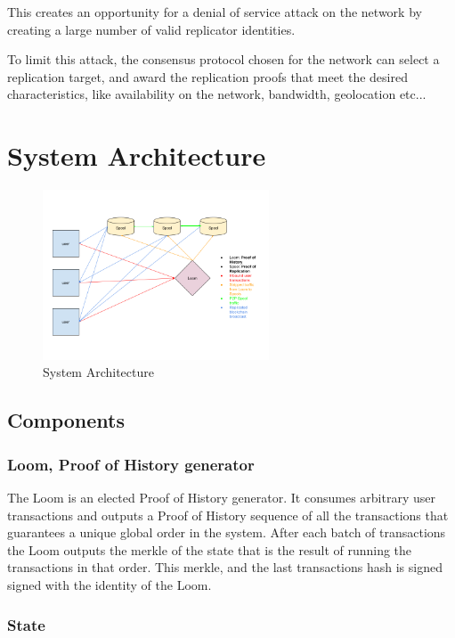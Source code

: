 \documentclass[12pt]{article}
\begin{document}
This creates an opportunity for a denial of service attack on the network by creating a large number of valid replicator identities.

To limit this attack, the consensus protocol chosen for the network can select a replication target, and award the replication proofs that meet the desired characteristics, like availability on the network, bandwidth, geolocation etc...
\section{System Architecture}\label{system_architecture}

\begin{figure}
  \begin{center}
    \centering
    \includegraphics[width=0.6\textwidth]{figures/fig_9.png}
    \caption[Fig 9]{System Architecture \label{fig_9}}
  \end{center}
  \end{figure}

\subsection{Components}

\subsubsection{Loom, Proof of History generator}
The Loom is an elected Proof of History generator. It consumes arbitrary user transactions and outputs a Proof of History sequence of all the transactions that guarantees a unique global order in the system. After each batch of transactions the Loom outputs the merkle of the state that is the result of running the transactions in that order. This merkle, and the last transactions hash is signed signed with the identity of the Loom.

\subsubsection{State}
\end{document}
